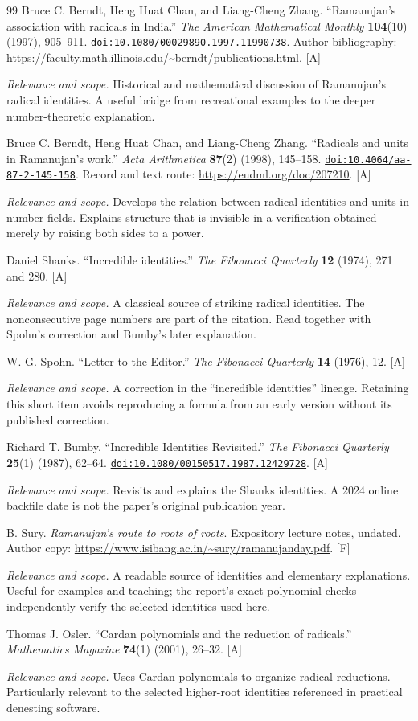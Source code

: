 \documentclass[11pt,letterpaper]{article}
\numberwithin{equation}{section}
\theoremstyle{definition}
\theoremstyle{remark}
\newcommand{\doi}[1]{\href{https://doi.org/#1}{\nolinkurl{doi:#1}}}
\newcommand{\status}[1]{\textsf{\small[#1]}}
\newcommand{\entrynote}[1]{\par\smallskip\noindent\emph{Relevance and scope.} #1}
\begin{document}
\begin{thebibliography}{99}
Bruce C. Berndt, Heng Huat Chan, and Liang-Cheng Zhang. ``Ramanujan's association with radicals in India.'' \emph{The American Mathematical Monthly} \textbf{104}(10) (1997), 905--911. \doi{10.1080/00029890.1997.11990738}. Author bibliography: \url{https://faculty.math.illinois.edu/~berndt/publications.html}. \status{A}
\entrynote{Historical and mathematical discussion of Ramanujan's radical identities. A useful bridge from recreational examples to the deeper number-theoretic explanation.}

Bruce C. Berndt, Heng Huat Chan, and Liang-Cheng Zhang. ``Radicals and units in Ramanujan's work.'' \emph{Acta Arithmetica} \textbf{87}(2) (1998), 145--158. \doi{10.4064/aa-87-2-145-158}. Record and text route: \url{https://eudml.org/doc/207210}. \status{A}
\entrynote{Develops the relation between radical identities and units in number fields. Explains structure that is invisible in a verification obtained merely by raising both sides to a power.}

Daniel Shanks. ``Incredible identities.'' \emph{The Fibonacci Quarterly} \textbf{12} (1974), 271 and 280. \status{A}
\entrynote{A classical source of striking radical identities. The nonconsecutive page numbers are part of the citation. Read together with Spohn's correction and Bumby's later explanation.}

W. G. Spohn. ``Letter to the Editor.'' \emph{The Fibonacci Quarterly} \textbf{14} (1976), 12. \status{A}
\entrynote{A correction in the ``incredible identities'' lineage. Retaining this short item avoids reproducing a formula from an early version without its published correction.}

Richard T. Bumby. ``Incredible Identities Revisited.'' \emph{The Fibonacci Quarterly} \textbf{25}(1) (1987), 62--64. \doi{10.1080/00150517.1987.12429728}. \status{A}
\entrynote{Revisits and explains the Shanks identities. A 2024 online backfile date is not the paper's original publication year.}

B. Sury. \emph{Ramanujan's route to roots of roots}. Expository lecture notes, undated. Author copy: \url{https://www.isibang.ac.in/~sury/ramanujanday.pdf}. \status{F}
\entrynote{A readable source of identities and elementary explanations. Useful for examples and teaching; the report's exact polynomial checks independently verify the selected identities used here.}

Thomas J. Osler. ``Cardan polynomials and the reduction of radicals.'' \emph{Mathematics Magazine} \textbf{74}(1) (2001), 26--32. \status{A}
\entrynote{Uses Cardan polynomials to organize radical reductions. Particularly relevant to the selected higher-root identities referenced in practical denesting software.}


\end{thebibliography}
\end{document}
